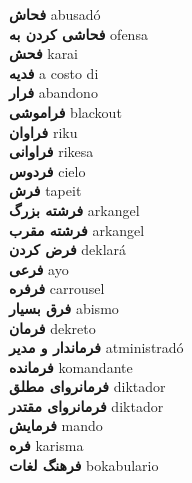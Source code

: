\textbf{ فحاش  } abusadó \\
\textbf{ فحاشی کردن به  } ofensa \\
\textbf{ فحش  } karai \\
\textbf{ فدیه  } a costo di \\
\textbf{ فرار  } abandono \\
\textbf{ فراموشی  } blackout \\
\textbf{ فراوان  } riku \\
\textbf{ فراوانی  } rikesa \\
\textbf{ فردوس  } cielo \\
\textbf{ فرش  } tapeit \\
\textbf{ فرشته بزرگ  } arkangel \\
\textbf{ فرشته مقرب  } arkangel \\
\textbf{ فرض کردن  } deklará \\
\textbf{ فرعی  } ayo \\
\textbf{ فرفره  } carrousel \\
\textbf{ فرق بسیار  } abismo \\
\textbf{ فرمان  } dekreto \\
\textbf{ فرماندار و مدیر  } atministradó \\
\textbf{ فرمانده  } komandante \\
\textbf{ فرمانروای مطلق  } diktador \\
\textbf{ فرمانروای مقتدر  } diktador \\
\textbf{ فرمایش  } mando \\
\textbf{ فره  } karisma \\
\textbf{ فرهنگ لغات  } bokabulario \\
